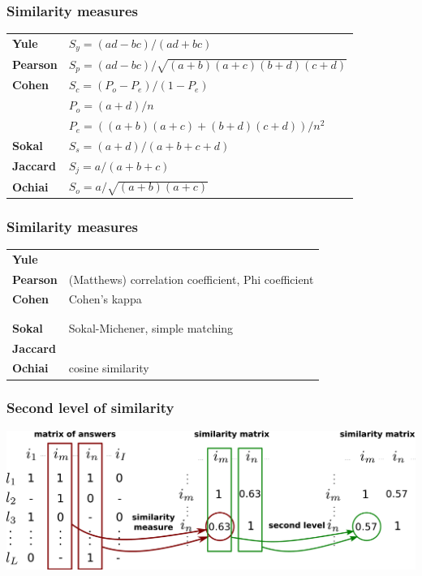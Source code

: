 \documentclass[xcolor=svgnames]{beamer}
\begin{document}
\begin{frame}
    \frametitle{Similarity measures}

    \begin{tabular}{ll}
         \textbf{Yule} & $S_y = (ad-bc) / (ad+bc)$ \\[2mm]
         \textbf{Pearson}  &   $S_p = (ad - bc) /
         \sqrt{(a+b)(a+c)(b+d)(c+d)}$ \\[2mm]
         \textbf{Cohen} &   $S_c = (P_o - P_e) / (1 - P_e)$ \\
         & $ P_o = (a + d) / n$ \\
         & $P_e = ((a+b)(a+c) + (b+d)(c+d)) / n^2$\\[2mm]
         \textbf{Sokal} & $S_s = (a+d) / (a+b+c+d)$ \\[2mm] %
         \textbf{Jaccard} & $S_j = a / (a+b+c)$ \\[2mm]
         \textbf{Ochiai} &  $S_o = a / \sqrt{(a+b)(a+c)}$ \\
    \end{tabular}
\end{frame}
\begin{frame}
    \frametitle{Similarity measures}

    \begin{tabular}{ll}
         \textbf{Yule} &  \\[2mm]
         \textbf{Pearson}  &  (Matthews) correlation coefficient, Phi coefficient \\[2mm]
         \textbf{Cohen} &  Cohen’s kappa  \\
         &  \\
         & \\[2mm]
         \textbf{Sokal} & Sokal-Michener, simple matching\\[2mm] %
         \textbf{Jaccard} & \\[2mm]
         \textbf{Ochiai} &  cosine similarity \\
    \end{tabular}
\end{frame}
\begin{frame}
    \frametitle{Second level of similarity}
    \centering
    \includegraphics[width=\linewidth]{figures/diagram-second-step}
\end{frame}
\end{document}
